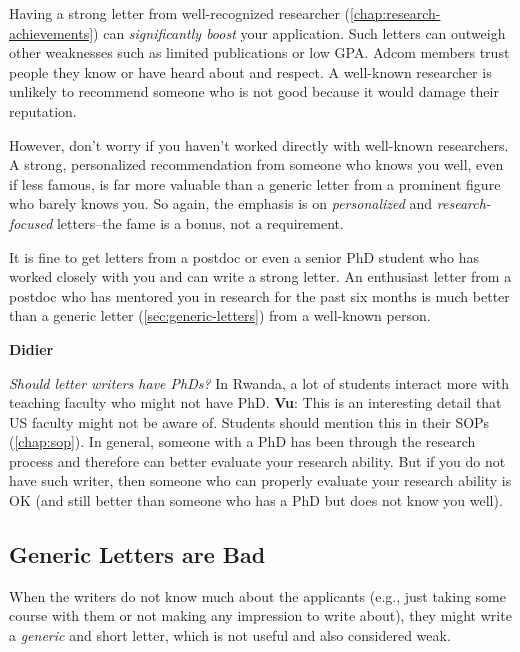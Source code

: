 \documentclass[oneside,11pt]{book}
\newenvironment{surprisebox}[1][]{
  \small
  \begin{marker}[\faChessKnight{}]
    {\textbf{#1}}
  }{
  \end{marker}
}
\newenvironment{questionbox}[1][]{
  \small
  \begin{marker}[\faChessRook{}]
    {\textbf{#1}}
  }{
  \end{marker}
}
\begin{document}
Having a strong letter from well-recognized researcher (\autoref{chap:research-achievements}) can \emph{significantly boost} your application. Such letters can outweigh other weaknesses such as limited publications or low GPA. Adcom members trust people they know or have heard about and respect.  A well-known researcher is unlikely to recommend someone who is not good because it would damage their reputation.

However, don't worry if you haven't worked directly with well-known researchers. A strong, personalized recommendation from someone who knows you well, even if less famous, is far more valuable than a generic letter from a prominent figure who barely knows you. So again, the emphasis is on \emph{personalized} and \emph{research-focused} letters--the fame is a bonus, not a requirement. 

\begin{surprisebox}
  It is fine to get letters from a postdoc or even a senior PhD student who has worked closely with you and can write a strong letter. An enthusiast letter from a postdoc who has mentored you in research for the past six months is much better than a generic letter (\autoref{sec:generic-letters}) from a well-known person.
\end{surprisebox}


\begin{questionbox}[Didier]
    \emph{Should letter writers have PhDs?}  In Rwanda, a lot of students interact more with teaching faculty who might not have PhD.
    \tcblower
    \textbf{Vu}: This is an interesting detail that US faculty might not be aware of. Students should mention this in their SOPs (\autoref{chap:sop}). In general, someone with a PhD has been through the research process and therefore can better evaluate your research ability.  But if you do not have such writer, then someone who can properly evaluate your research ability is OK (and still better than someone who has a PhD but does not know you well).
  \end{questionbox}



  \subsection{Generic Letters are Bad}\label{sec:generic-letters} 
  When the writers do not know much about the applicants (e.g., just taking some course with them or not making any impression to write about), they might write a \emph{generic} and short letter, which is not useful and also considered weak. 
  
\end{document}
